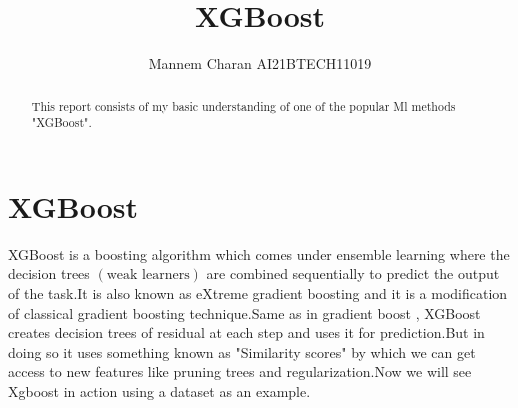 \documentclass[journal,12pt,onecolumn]{IEEEtran}
\providecommand{\brak}[1]{\ensuremath{\left(#1\right)}}
\theoremstyle{remark}
\numberwithin{equation}{section}
\begin{document}
		\title{XGBoost}
		\author{ Mannem Charan AI21BTECH11019}
		 \maketitle
		\begin{abstract}
			This report consists of my basic understanding of one of the popular Ml methods "XGBoost".
		\end{abstract}
		\section{XGBoost}
		  XGBoost is a boosting algorithm which comes under ensemble learning where the decision trees $\brak{\text{weak learners}}$ are combined sequentially to predict the output of the task.It is also known as eXtreme gradient boosting and it is a modification of classical gradient boosting technique.Same as in gradient boost , XGBoost creates decision trees of residual at each step and uses it for prediction.But in doing so it uses something known as "Similarity scores" by which we can get access to new features like pruning trees and regularization.Now we will see Xgboost in action using a dataset as an example.
\end{document}
